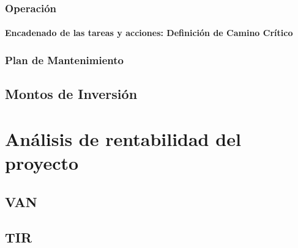 \documentclass[10pt,a4paper]{report}
\begin{document}
\subsection{Operación}

\subsubsection{Encadenado de las tareas y acciones: Definición de Camino Crítico}

\subsection{Plan de Mantenimiento}

\section{Montos de Inversión}



\chapter{Análisis de rentabilidad del proyecto}

\section{VAN}

\section{TIR}
\end{document}
